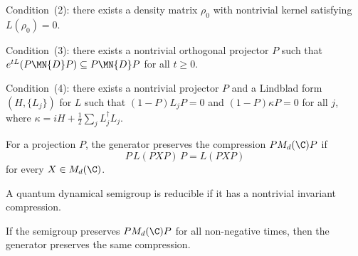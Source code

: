 \begin{definition}\label{def:has_rank_deficient_kernel_element}
    \leanok
    Condition~(2): there exists a density matrix $\rho_0$ with nontrivial
    kernel satisfying $L(\rho_0) = 0$.
\end{definition}

\begin{definition}\label{def:has_invariant_compression}
    \leanok
    Condition~(3): there exists a nontrivial orthogonal projector $P$ such
    that $e^{tL}(P \MN{D} P) \subseteq P \MN{D} P$ for all $t \ge 0$.
\end{definition}

\begin{definition}
    \label{def:has_block_upper_triangular_lindblad}
    \leanok
    Condition~(4): there exists a nontrivial projector $P$ and a Lindblad form
    $(H, \{L_j\})$ for $L$ such that $(1-P)L_j P = 0$ and
    $(1-P)\kappa P = 0$ for all $j$, where
    $\kappa = iH + \frac{1}{2}\sum_j L_j^\dagger L_j$.
\end{definition}

\begin{definition}
    \label{def:generator_preserves_compression_ch12}
    \leanok
    For a projection $P$, the generator preserves the compression $P M_d(\C) P$ if
    \[
        P\,L(PXP)\,P = L(PXP)
    \]
    for every $X \in M_d(\C)$.
\end{definition}

\begin{definition}
    \label{def:is_reducible_qds_ch12}
    \leanok
    A quantum dynamical semigroup is reducible if it has a nontrivial invariant compression.
\end{definition}

\begin{theorem}
    \label{thm:generator_preserves_compression_from_semigroup_ch12}
    \leanok
    If the semigroup preserves $P M_d(\C) P$ for all non-negative times, then the generator
    preserves the same compression.
\end{theorem}

